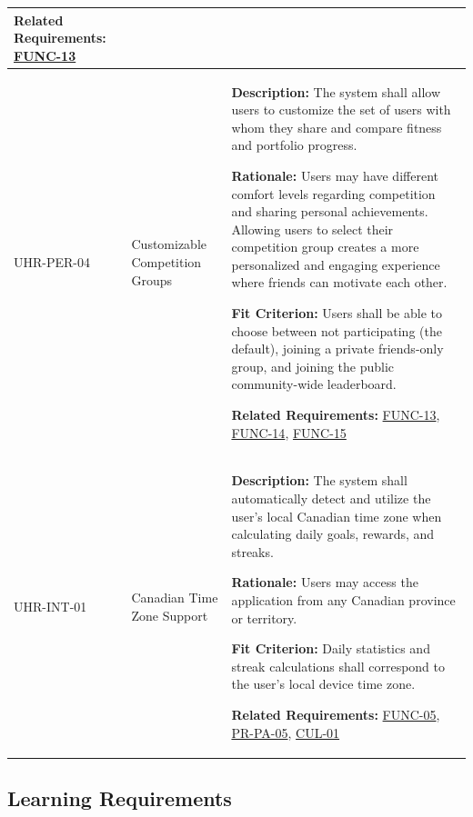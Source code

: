 \documentclass[12pt]{article}
\begin{document}
\begin{xltabular}{\textwidth}{|p{2.6cm}|p{3.4cm}|X|}
\textbf{Related Requirements:} \hyperlink{req:FUNC-13}{FUNC-13}\\
\hline

UHR-PER-04\hypertarget{req:UHR-PER-04}{} &
Customizable Competition Groups &
\textbf{Description:} The system shall allow users to customize the set of users with whom they share and compare fitness and portfolio progress.

\textbf{Rationale:} Users may have different comfort levels regarding competition and sharing personal achievements. Allowing users to select their competition group creates a more personalized and engaging experience where friends can motivate each other.

\textbf{Fit Criterion:} Users shall be able to choose between not participating (the default), joining a private friends-only group, and joining the public community-wide leaderboard.

\textbf{Related Requirements:} \hyperlink{req:FUNC-13}{FUNC-13}, \hyperlink{req:FUNC-14}{FUNC-14}, \hyperlink{req:FUNC-15}{FUNC-15}\\
\hline

UHR-INT-01\hypertarget{req:UHR-INT-01}{} &
Canadian Time Zone Support &
\textbf{Description:} The system shall automatically detect and utilize the user's local Canadian time zone when calculating daily goals, rewards, and streaks.

\textbf{Rationale:} Users may access the application from any Canadian province or territory.

\textbf{Fit Criterion:} Daily statistics and streak calculations shall correspond to the user's local device time zone.

\textbf{Related Requirements:} \hyperlink{req:FUNC-05}{FUNC-05}, \hyperlink{req:PR-PA-05}{PR-PA-05}, \hyperlink{req:CUL-01}{CUL-01}\\
\hline

\end{xltabular}

\subsection{Learning Requirements}
\end{document}
